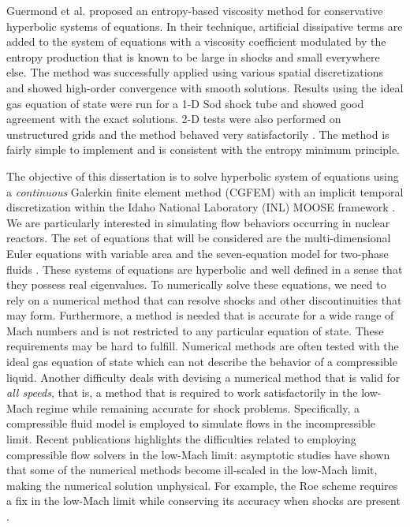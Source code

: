 Guermond et al. \cite{jlg1, jlg2, jlg3} proposed an entropy-based viscosity method for conservative hyperbolic systems of equations. In their technique, artificial dissipative terms are added to the system of equations with a viscosity coefficient modulated by the entropy production that is known to be large in shocks and small everywhere else. The method was successfully applied using various spatial discretizations \cite{jlg2, jlg3, valentin} and showed high-order convergence with smooth solutions. Results using the ideal gas equation of state were run for a 1-D Sod shock tube and showed good agreement with the exact solutions. 2-D tests were also performed on unstructured grids and the method behaved very satisfactorily \cite{jlg1,valentin}. The method is fairly simple to implement and is consistent with the entropy minimum principle.

The objective of this dissertation is to solve hyperbolic system of equations using a \emph{continuous} Galerkin finite element method (CGFEM) with an implicit temporal discretization within the Idaho National Laboratory (INL) MOOSE framework \cite{Moose}. We are particularly interested in simulating flow behaviors occurring in nuclear reactors. The set of equations that will be considered are the multi-dimensional Euler equations with variable area \cite{Toro} and the seven-equation model for two-phase fluids \cite{SEM}. These systems of equations are hyperbolic and well defined in a sense that they possess real eigenvalues. To numerically solve these equations, we need to rely on a numerical method that can resolve shocks and other discontinuities that may form. Furthermore, a method is needed that is accurate for a wide range of Mach numbers and is not restricted to any particular equation of state. These requirements may be hard to fulfill. Numerical methods are often tested with the ideal gas equation of state which can not describe the behavior of a compressible liquid. Another difficulty deals with devising a numerical method that is valid for \emph{all speeds}, that is, a method that is required to work  satisfactorily in the low-Mach regime while remaining accurate for shock problems. Specifically, a compressible fluid model is employed to simulate flows in the incompressible limit. Recent publications \cite{LowMach1, LowMach2} highlights the difficulties related to employing compressible flow solvers in the low-Mach limit: asymptotic studies have shown that some of the numerical methods become ill-scaled in the low-Mach limit, making the numerical solution unphysical. For example, the Roe scheme requires a fix in the low-Mach limit while conserving its accuracy when shocks are present \cite{Roe}. 

